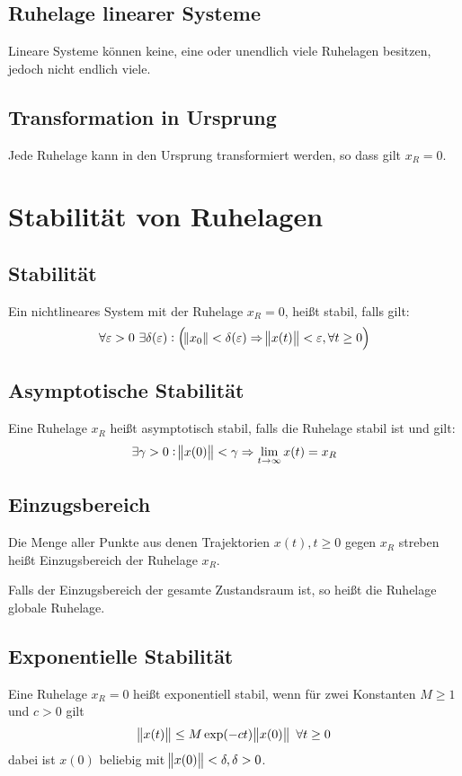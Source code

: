 \subsection{Ruhelage linearer Systeme}
Lineare Systeme können keine, eine oder unendlich viele Ruhelagen besitzen, jedoch nicht 
endlich viele.

\subsection{Transformation in Ursprung}
Jede Ruhelage kann in den Ursprung transformiert werden, so dass gilt $x_R = 0$.

\section{Stabilität von Ruhelagen}
\subsection{Stabilität}
Ein nichtlineares System mit der Ruhelage $x_R = 0$, heißt stabil, falls gilt:
\begin{equation}
    \forall \varepsilon > 0\ \exists \delta(\varepsilon): \left( \norm{x_0} < \delta(\varepsilon) \Rightarrow \norm{x(t)} < \varepsilon, \forall t \geq 0\right)
\end{equation}

\subsection{Asymptotische Stabilität}
Eine Ruhelage $x_R$ heißt asymptotisch stabil, falls die Ruhelage stabil ist und gilt:
\begin{equation}
    \exists \gamma > 0: \norm{x(0)} < \gamma \Rightarrow \lim_{t \to \infty} x(t) = x_R
\end{equation}

\subsection{Einzugsbereich}
Die Menge aller Punkte aus denen Trajektorien $x(t), t \geq 0$ gegen $x_R$ streben heißt
Einzugsbereich der Ruhelage $x_R$.

Falls der Einzugsbereich der gesamte Zustandsraum ist, so heißt die Ruhelage globale Ruhelage.

\subsection{Exponentielle Stabilität}
Eine Ruhelage $x_R=0$ heißt exponentiell stabil, wenn für zwei Konstanten
$M \geq 1$ und $c>0$ gilt
\begin{equation}
    \norm{x(t)} \leq M \exp(-ct) \norm{x(0)}\ \forall t \geq 0
\end{equation}
dabei ist $x(0)$ beliebig mit $\norm{x(0)} < \delta, \delta > 0$.

